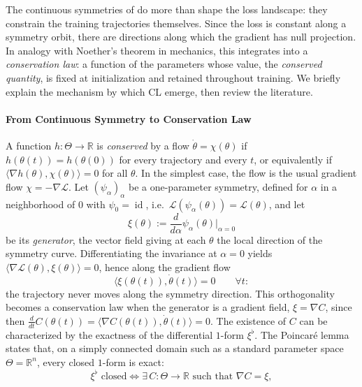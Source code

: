 \documentclass[mathematics,review,submit,moreauthors]{Definitions/mdpi}
\begin{document}
The continuous symmetries of  do more than shape the loss landscape: they constrain the training trajectories themselves.
Since the loss is constant along a symmetry orbit, there are directions along which the gradient has null projection.
In analogy with Noether's theorem in mechanics, this integrates into a \emph{conservation law}: a function of the parameters whose value, the \emph{conserved quantity}, is fixed at initialization and retained throughout training.
We briefly explain the mechanism by which CL emerge, then review the literature.

\paragraph{From Continuous Symmetry to Conservation Law}
A function $h:\Theta\to\mathbb{R}$ is \emph{conserved} by a flow $\dot\theta=\chi(\theta)$ if $h(\theta(t))=h(\theta(0))$ for every trajectory and every $t$, or equivalently if $\langle\nabla h(\theta),\chi(\theta)\rangle=0$ for all $\theta$.
In the simplest case, the flow is the usual gradient flow $\chi=-\nabla\mathcal{L}$.
Let $(\psi_\alpha)_\alpha$ be a one-parameter symmetry, defined for $\alpha$ in a neighborhood of $0$ with $\psi_0=\operatorname{id}$, i.e.\ $\mathcal{L}(\psi_\alpha(\theta))=\mathcal{L}(\theta)$, and let
\begin{equation*}
    \xi(\theta):=\frac{d}{d\alpha}\psi_\alpha(\theta)\Big\vert_{\alpha=0}
\end{equation*}
be its \emph{generator}, the vector field giving at each $\theta$ the local direction of the symmetry curve.
Differentiating the invariance at $\alpha=0$ yields $\langle\nabla\mathcal{L}(\theta),\xi(\theta)\rangle=0$, hence along the gradient flow
\begin{equation*}
    \langle \xi(\theta(t)), \dot\theta(t)\rangle=0 \qquad \forall t:
\end{equation*}
the trajectory never moves along the symmetry direction.
This orthogonality becomes a conservation law when the generator is a gradient field, $\xi=\nabla C$, since then $\frac{d}{dt}C(\theta(t))=\langle\nabla C(\theta(t)),\dot\theta(t)\rangle=0$.
The existence of $C$ can be characterized by the exactness of the differential $1$-form $\xi^\flat$.
The Poincar\'e lemma states that, on a simply connected domain such as a standard parameter space $\Theta=\mathbb{R}^n$, every closed $1$-form is exact:
\begin{equation*}
    \xi^\flat \text{ closed} \iff \exists\, C:\Theta\to\mathbb{R} \text{ such that } \nabla C=\xi,
\end{equation*}
\end{document}
